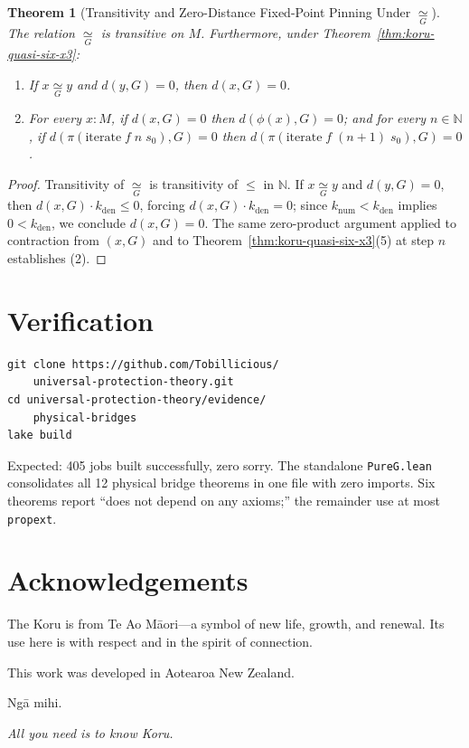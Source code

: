 \documentclass[12pt,a4paper]{article}
\newcommand{\koruG}{\mathrel{\underset{G}{\simeq}}}
\newtheorem{theorem}[thm]{Theorem}
\begin{document}
\begin{theorem}[Transitivity and Zero-Distance Fixed-Point Pinning Under $\koruG$]
\label{thm:zero-pinning}
The relation $\koruG$ is transitive on $M$. Furthermore, under Theorem~\ref{thm:koru-quasi-six-x3}:
\begin{enumerate}
  \item If $x \mathrel{\koruG} y$ and $d(y, G) = 0$, then $d(x, G) = 0$.
  \item For every $x : M$, if $d(x, G) = 0$ then $d(\phi(x), G) = 0$; and for every $n \in \mathbb{N}$, if $d(\pi(\mathrm{iterate}\;f\;n\;s_0), G) = 0$ then $d(\pi(\mathrm{iterate}\;f\;(n+1)\;s_0), G) = 0$.
\end{enumerate}
\end{theorem}

\begin{proof}
Transitivity of $\koruG$ is transitivity of $\le$ in $\mathbb{N}$. If $x \mathrel{\koruG} y$ and $d(y, G) = 0$, then $d(x, G) \cdot k_{\mathrm{den}} \le 0$, forcing $d(x, G) \cdot k_{\mathrm{den}} = 0$; since $k_{\mathrm{num}} < k_{\mathrm{den}}$ implies $0 < k_{\mathrm{den}}$, we conclude $d(x, G) = 0$. The same zero-product argument applied to contraction from $(x, G)$ and to Theorem~\ref{thm:koru-quasi-six-x3}(5) at step $n$ establishes (2).
\end{proof}

\section*{Verification}

\begin{verbatim}
git clone https://github.com/Tobillicious/
    universal-protection-theory.git
cd universal-protection-theory/evidence/
    physical-bridges
lake build
\end{verbatim}

Expected: 405 jobs built successfully, zero sorry. The standalone
\texttt{PureG.lean} consolidates all 12 physical bridge theorems in one
file with zero imports. Six theorems report ``does not depend on any
axioms;'' the remainder use at most \texttt{propext}.

\section*{Acknowledgements}

The Koru is from Te Ao M\=aori---a symbol of new life, growth, and
renewal. Its use here is with respect and in the spirit of connection.

This work was developed in Aotearoa New Zealand.

Ng\=a mihi.

\medskip
\noindent
\textit{All you need is to know Koru.}
\end{document}
